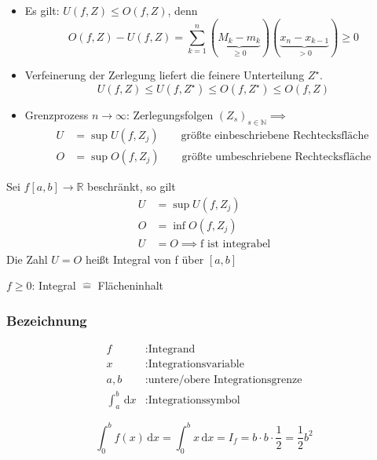 \begin{itemize}
	\item Es gilt: \( U(f,Z) \leq O(f,Z) \), denn
	\[ O(f,Z)- U(f,Z)=\sum_{k=1}^n(\underbrace{M_k-m_k}_{\geq0})(\underbrace{x_n-x_{k-1}}_{>0}) \geq 0 \]
	\item Verfeinerung der Zerlegung liefert die feinere Unterteilung \( Z^\star \). 
	\[ U(f,Z) \leq U(f, Z^\star) \leq O(f,Z^\star) \leq O(f,Z) \]
	\item Grenzprozess \( n \rightarrow \infty \): Zerlegungsfolgen \( (Z_s)_{s\in\mathbb{N}} \implies \) 
	\begin{align*}
		U &= \sup U(f,Z_j) \qquad \text{größte einbeschriebene Rechtecksfläche}\\
		O &= \sup O(f,Z_j) \qquad \text{größte umbeschriebene Rechtecksfläche}
	\end{align*}
\end{itemize}

\begin{definition}[Integrierbarkeit]
	Sei \( f[a,b] \rightarrow \mathbb{R} \) beschränkt, so gilt
	\begin{align*}
		U &= \sup U(f,Z_j)\\
		O &= \inf O(f,Z_j)\\
		U &= O \implies \text{f ist integrabel}
	\end{align*}
	Die Zahl \( U = O \) heißt Integral von f über \( [a,b] \)
\end{definition}

\begin{note}
	\( f \geq 0 \): Integral \( \hat{=} \) Flächeninhalt
\end{note}

\subsubsection*{Bezeichnung}
\begin{align*}
	f&: \text{Integrand} \\
	x&: \text{Integrationsvariable}\\
	a,b&: \text{untere/obere Integrationsgrenze}\\	
	\int_a^b \,\mathrm{d}x &:\text{Integrationssymbol}
\end{align*}

\begin{example}[f(x)=x in \lbrack0,b\rbrack]
	\[
		\int_0^b f(x) \,\mathrm{d}x = \int_0^b x \,\mathrm{d}x = I_f = b \cdot b \cdot \frac{1}{2} = \frac{1}{2} b^2
	\]
\end{example}



